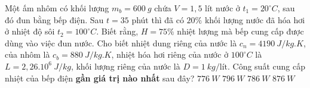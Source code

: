 \begin{ex}%
	Một ấm nhôm có khối lượng $m_b = 600\ g$ chứa $V = 1,5$ lít nước ở $t_1 = 20^\circ C$, sau đó đun bằng bếp điện. Sau $t = 35$ phút thì đã có $20\%$ khối lượng nước đã hóa hơi ở nhiệt độ sôi $t_2 = 100^\circ C$. Biết rằng, $H = 75\%$ nhiệt lượng mà bếp cung cấp được dùng vào việc đun nước. Cho biết nhiệt dung riêng của nước là $c_n = 4190\ J/kg.K$, của nhôm là $c_b = 880\ J/kg.K$, nhiệt hóa hơi riêng của nước ở $100^\circ C$ là $L = 2,26.10^6\ J/kg$, khối lượng riêng của nước là $D = 1\ kg/\text{lít}$. Công suất cung cấp nhiệt của bếp điện \textbf{gần giá trị nào nhất} sau đây?
	\choice
	{\True $776\ W$}
	{$796\ W$}
	{$786\ W$}
	{$876\ W$}
\end{ex}


